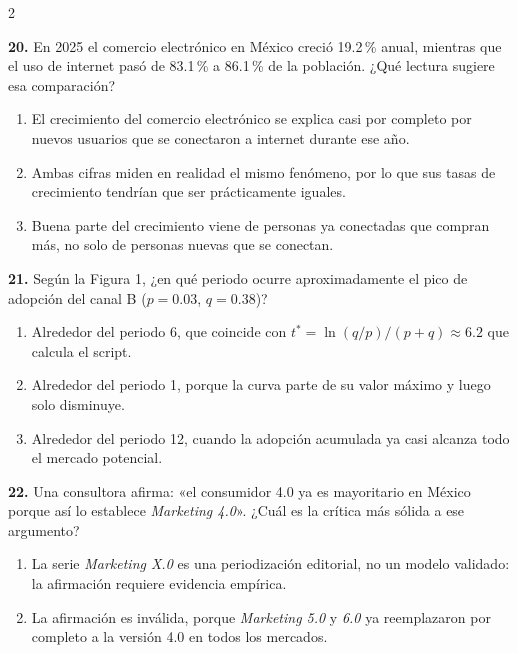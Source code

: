 \documentclass[10pt,letterpaper]{article}
\begin{document}
\begin{multicols}{2}
\begin{enumerate}[label=\alph*),leftmargin=1.1em,itemsep=0pt,topsep=1pt,parsep=0pt,partopsep=0pt]
\end{enumerate}
\vspace{2pt}
\noindent\textbf{20.} En 2025 el comercio electrónico en México creció 19.2\,\% anual, mientras que el uso de internet pasó de 83.1\,\% a 86.1\,\% de la población. ¿Qué lectura sugiere esa comparación?
\vspace{-3pt}
\begin{enumerate}[label=\alph*),leftmargin=1.1em,itemsep=0pt,topsep=1pt,parsep=0pt,partopsep=0pt]
\item El crecimiento del comercio electrónico se explica casi por completo por nuevos usuarios que se conectaron a internet durante ese año.
\item Ambas cifras miden en realidad el mismo fenómeno, por lo que sus tasas de crecimiento tendrían que ser prácticamente iguales.
\item Buena parte del crecimiento viene de personas ya conectadas que compran más, no solo de personas nuevas que se conectan.
\end{enumerate}
\vspace{2pt}
\noindent\textbf{21.} Según la Figura 1, ¿en qué periodo ocurre aproximadamente el pico de adopción del canal B ($p=0.03$, $q=0.38$)?
\vspace{-3pt}
\begin{enumerate}[label=\alph*),leftmargin=1.1em,itemsep=0pt,topsep=1pt,parsep=0pt,partopsep=0pt]
\item Alrededor del periodo 6, que coincide con $t^\ast=\ln(q/p)/(p+q)\approx 6.2$ que calcula el script.
\item Alrededor del periodo 1, porque la curva parte de su valor máximo y luego solo disminuye.
\item Alrededor del periodo 12, cuando la adopción acumulada ya casi alcanza todo el mercado potencial.
\end{enumerate}
\vspace{2pt}
\noindent\textbf{22.} Una consultora afirma: «el consumidor 4.0 ya es mayoritario en México porque así lo establece \textit{Marketing 4.0}». ¿Cuál es la crítica más sólida a ese argumento?
\vspace{-3pt}
\begin{enumerate}[label=\alph*),leftmargin=1.1em,itemsep=0pt,topsep=1pt,parsep=0pt,partopsep=0pt]
\item La serie \textit{Marketing X.0} es una periodización editorial, no un modelo validado: la afirmación requiere evidencia empírica.
\item La afirmación es inválida, porque \textit{Marketing 5.0} y \textit{6.0} ya reemplazaron por completo a la versión 4.0 en todos los mercados.

\end{enumerate}
\end{multicols}
\end{document}
